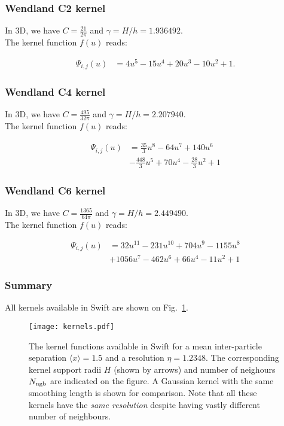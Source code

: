 \documentclass[a4paper]{mnras}
\newcommand{\swift}{{\sc Swift}\xspace}
\begin{document}
\subsubsection{Wendland C2 kernel}

In 3D, we have $C=\frac{21}{2\pi}$ and $\gamma=H/h = 1.936492$.\\
The kernel function $f(u)$ reads:

\begin{align}
  \Psi_{i,j}(u) &= 4u^5 - 15u^4 + 20u^3 - 10u^2 + 1.
    \nonumber
\end{align}


\subsubsection{Wendland C4 kernel}

In 3D, we have $C=\frac{495}{32\pi}$ and $\gamma=H/h = 2.207940$.\\
The kernel function $f(u)$ reads:

\begin{align}
  \Psi_{i,j}(u) &= \frac{35}{3}u^8 - 64u^7 + 140u^6     \nonumber\\
  & - \frac{448}{3}u^5 + 70u^4 - \frac{28}{3}u^2 + 1
    \nonumber
\end{align}


\subsubsection{Wendland C6 kernel}

In 3D, we have $C=\frac{1365}{64\pi}$ and $\gamma=H/h = 2.449490$.\\
The kernel function $f(u)$ reads:

\begin{align}
  \Psi_{i,j}(u) &= 32u^{11} - 231u^{10} + 704u^9 - 1155u^8     \nonumber\\
  & + 1056u^7 - 462u^6 + 66u^4 - 11u^2 + 1
    \nonumber
\end{align}


\subsubsection{Summary}

All kernels available in \swift are shown on Fig.~\ref{fig:sph:kernels}.

\begin{figure}
\texttt{[image: kernels.pdf]}
\caption{The kernel functions available in \swift for a mean
  inter-particle separation $\langle x\rangle=1.5$ and a resolution
  $\eta=1.2348$. The corresponding kernel support radii $H$ (shown by
  arrows) and number of neighours $N_{\rm ngb}$ are indicated on the
  figure. A Gaussian kernel with the same smoothing length is shown
  for comparison. Note that all these kernels have the \emph{same
    resolution} despite having vastly different number of neighbours.}
\label{fig:sph:kernels}
\end{figure}
\end{document}
